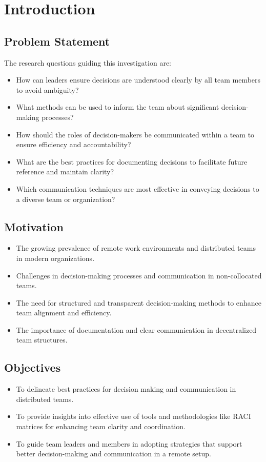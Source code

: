 \documentclass[12pt]{article}
\begin{document}
\newpage

\section{Introduction}

\subsection{Problem Statement}
The research questions guiding this investigation are:
\begin{itemize}
  \item How can leaders ensure decisions are understood clearly by all team members to avoid ambiguity?
  \item What methods can be used to inform the team about significant decision-making processes?
  \item How should the roles of decision-makers be communicated within a team to ensure efficiency and accountability?
  \item What are the best practices for documenting decisions to facilitate future reference and maintain clarity?
  \item Which communication techniques are most effective in conveying decisions to a diverse team or organization?
\end{itemize}


\subsection{Motivation}
\begin{itemize}
  \item The growing prevalence of remote work environments and distributed teams in modern organizations.
  \item Challenges in decision-making processes and communication in non-collocated teams.
  \item The need for structured and transparent decision-making methods to enhance team alignment and efficiency.
  \item The importance of documentation and clear communication in decentralized team structures.
\end{itemize}


\subsection{Objectives}
\begin{itemize}
  \item To delineate best practices for decision making and communication in distributed teams.
  \item To provide insights into effective use of tools and methodologies like RACI matrices for enhancing team clarity and coordination.
  \item To guide team leaders and members in adopting strategies that support better decision-making and communication in a remote setup.
\end{itemize}
\end{document}
